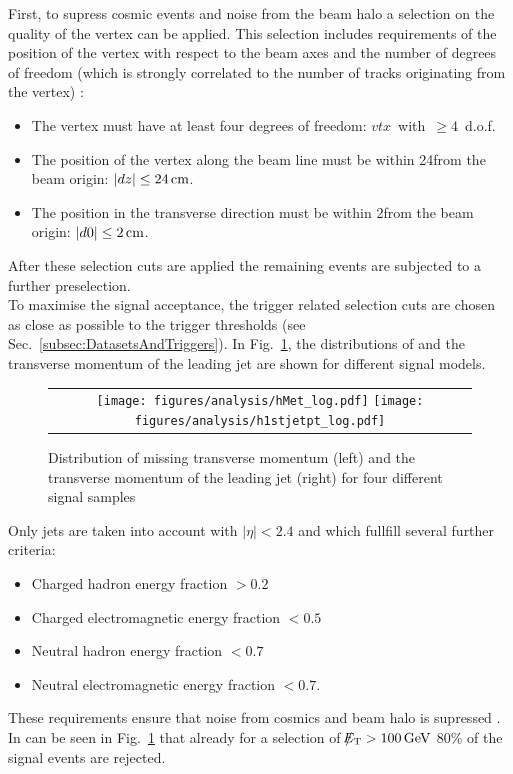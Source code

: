 First, to supress cosmic events and noise from the beam halo a selection on the quality of the vertex can be applied.
This selection includes requirements of the position of the vertex with respect to the beam axes and the number of degrees of freedom (which is strongly correlated to the number of tracks originating from the vertex) \cite{bib:CMS:Tracking_7TeV_PAS}:  
\begin{itemize}
\renewcommand{\labelitemi}{\footnotesize{\ding{118}}}
\item The vertex must have at least four degrees of freedom: \mbox{$vtx$ with $\geq 4$ d.o.f.}
\item The position of the vertex along the beam line must be within 24\cm from the beam origin: \mbox{$|dz| \leq 24\,\text{cm}$.}
\item The position in the transverse direction must be within 2\cm from the beam origin: \mbox{$|d0| \leq 2\,\text{cm}$.}
\end{itemize}
After these selection cuts are applied the remaining events are subjected to a further preselection.\\


To maximise the signal acceptance, the trigger related selection cuts are chosen as close as possible to the trigger thresholds (see Sec.~\ref{subsec:DatasetsAndTriggers}).
In Fig.~\ref{fig:SignalMET+SignalJetPt}, the distributions of \met and the transverse momentum of the leading jet \ptfirstjet are shown for different signal models.
\begin{figure}[!b]
  \centering 
  \begin{tabular}{c}
    \texttt{[image: figures/analysis/hMet\_log.pdf]}
    \texttt{[image: figures/analysis/h1stjetpt\_log.pdf]}
  \end{tabular}
  \caption{Distribution of missing transverse momentum (left) and the transverse momentum of the leading jet (right) for four different signal samples}
  \label{fig:SignalMET+SignalJetPt}
\end{figure}
Only jets are taken into account with $|\eta|<2.4$ and which fullfill several further criteria:
\begin{itemize}
\item Charged hadron energy fraction $>0.2$
\item Charged electromagnetic energy fraction $<0.5$
\item Neutral hadron energy fraction $<0.7$
\item Neutral electromagnetic energy fraction $<0.7$.
\end{itemize}
These requirements ensure that noise from cosmics and beam halo is supressed \cite{bib:CMS:DM_8TeV_AN}.
In can be seen in Fig.~\ref{fig:SignalMET+SignalJetPt} that already for a selection of $\slash\mkern-12mu{E}_{\text{T}}>100\,\text{Ge}\kern-0.06667em\text{V}$ 80\% of the signal events are rejected.

